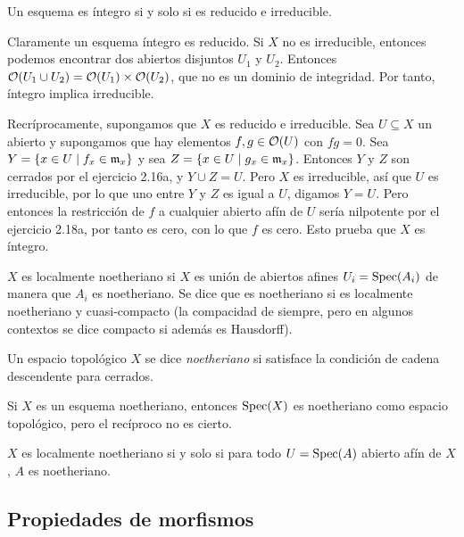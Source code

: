 \documentclass[GA.tex]{subfiles}
\begin{document}
\begin{prop}
Un esquema es íntegro si y solo si es reducido e irreducible.
\end{prop}
\begin{dem}
Claramente un esquema íntegro es reducido. Si $X$ no es irreducible, entonces podemos encontrar dos abiertos disjuntos $U_1$ y $U_2$. Entonces ${\mathcal O}(U_1\cup U_2)={\mathcal O}(U_1)\times{\mathcal O}(U_2)$, que no es un dominio de integridad. Por tanto, íntegro implica irreducible.

Recríprocamente, supongamos que $X$ es reducido e irreducible. Sea $U\subseteq X$ un abierto y supongamos que hay elementos $f,g\in{\mathcal O}(U)$ con $fg=0$. Sea $Y=\{x\in U\mid f_x\in{\mathfrak{m}}_x\}$ y sea $Z=\{x\in U\mid g_x\in{\mathfrak{m}}_x\}$. Entonces $Y$ y $Z$ son cerrados por el ejercicio 2.16a, y $Y\cup Z=U$. Pero $X$ es irreducible, así que $U$ es irreducible, por lo que uno entre $Y$ y $Z$ es igual a $U$, digamos $Y=U$. Pero entonces la restricción de $f$ a cualquier abierto afín de $U$ sería nilpotente por el ejercicio 2.18a, por tanto es cero, con lo que $f$ es cero. Esto prueba que $X$ es íntegro. 
\end{dem}

\begin{defi}
$X$ es localmente noetheriano si $X$ es unión de abiertos afines $U_i=\operatorname{Spec}(A_i)$ de manera que $A_i$ es noetheriano. Se dice que es noetheriano si es localmente noetheriano y cuasi-compacto (la compacidad de siempre, pero en algunos contextos se dice compacto si además es Hausdorff). 
\end{defi}

\begin{defi}
Un espacio topológico $X$ se dice \emph{noetheriano} si satisface la condición de cadena descendente para cerrados. 
\end{defi}

\begin{nota}
Si $X$ es un esquema noetheriano, entonces $\operatorname{Spec}(X)$ es noetheriano como espacio topológico, pero el recíproco no es cierto.
\end{nota}

\begin{prop}
$X$ es localmente noetheriano si y solo si para todo $U=\operatorname{Spec}(A)$ abierto afín de $X$, $A$ es noetheriano. 
\end{prop}


\subsection{Propiedades de morfismos}
\end{document}
